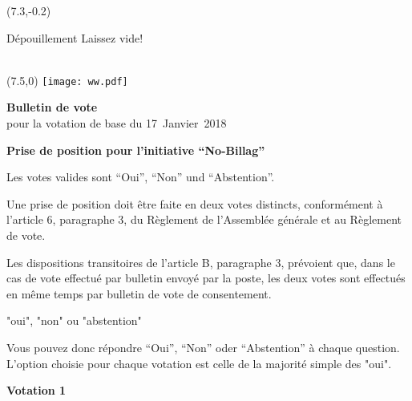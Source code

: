 \documentclass[11pt, a4paper]{scrartcl}
\begin{document}
{\begin{minipage}[t][12.5cm][t]{\textwidth}
\begin{textblock}{6}(7.3,-0.2)
\begin{framed}
Dépouillement \hfill Laissez vide! \\
\vspace{1.5cm} ~ \\
\end{framed}
\end{textblock}


\end{minipage}

\newpage

\begin{minipage}[t][12.5cm][t]{17.7cm}

\begin{textblock}{6}(7.5,0)
\texttt{[image: ww.pdf]}
\end{textblock}

{\LARGE\textbf{Bulletin de vote}} \\
pour la votation de base du 17~Janvier~2018 \\

\vspace{2cm}

\textbf{Prise de position pour l'initiative \enquote{No-Billag}}

\vspace{0.1cm}
Les votes valides sont \enquote{Oui}, \enquote{Non} und \enquote{Abstention}.

\vspace{0.1cm}
Une prise de position doit être faite en deux votes distincts, conformément à l'article 6, paragraphe 3, du Règlement de l'Assemblée générale et au Règlement de vote.

Les dispositions transitoires de l'article B, paragraphe 3, prévoient que, dans le cas de vote effectué par bulletin envoyé par la poste, les deux votes sont effectués en même temps par bulletin de vote de consentement.

 "oui", "non" ou "abstention"  

\vspace{0.1cm}
Vous pouvez donc répondre \enquote{Oui}, \enquote{Non} oder \enquote{Abstention} à chaque question. L'option choisie pour chaque votation est celle de la majorité simple des "oui".

\vspace{1cm}

\textbf{Votation 1}

\vspace{0.5cm}


\end{minipage}}
\end{document}
